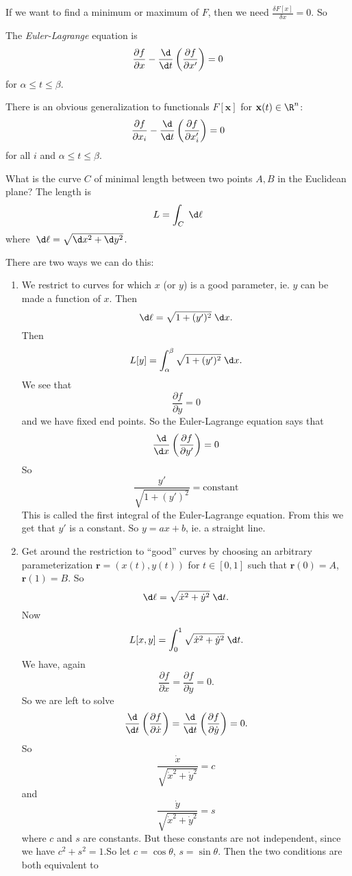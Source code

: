 \documentclass[a4paper]{article}
\begin{document}
If we want to find a minimum or maximum of $F$, then we need $\frac{\delta F[x]}{\delta x} = 0$. So
\begin{defi}
  The \emph{Euler-Lagrange} equation is
  \[
    \frac{\partial f}{\partial x} - \frac{\d}{\d t}\left(\frac{\partial f}{\partial  x'}\right) = 0
  \]
  for $\alpha \leq t \leq \beta$.
\end{defi}
There is an obvious generalization to functionals $F[\mathbf{x}]$  for $\mathbf{x}(t) \in \R^n$:
\[
  \frac{\partial f}{\partial x_i} - \frac{\d }{\d t}\left(\frac{\partial f}{\partial x_i'}\right) = 0
\]
for all $i$ and $\alpha \leq t \leq \beta$.
\begin{eg}
  What is the curve $C$ of minimal length between two points $A, B$ in the Euclidean plane? The length is
  \[
    L = \int_C \;\d \ell
  \]
  where $\;\d \ell = \sqrt{\d x^2 + \d y^2}$.

  There are two ways we can do this:
  \begin{enumerate}
    \item We restrict to curves for which $x$ (or $y$) is a good parameter, ie. $y$ can be made a function of $x$. Then
      \[
        \d \ell = \sqrt{1 + (y')^2}\;\d x.
      \]
      Then
      \[
        L[y] = \int_\alpha^\beta \sqrt{1 + (y')^2}\;\d x.
      \]
      We see that
      \[
        \frac{\partial f}{\partial y} = 0
      \]
      and we have fixed end points. So the Euler-Lagrange equation says that
      \[
        \frac{\d}{\d x} \left(\frac{\partial f}{\partial y'}\right) = 0
      \]
      So
      \[
        \frac{y'}{\sqrt{1 + (y')^2}} = \text{constant}
      \]
      This is called the first integral of the Euler-Lagrange equation. From this we get that $y'$ is a constant. So $y = ax + b$, ie. a straight line.
    \item Get around the restriction to ``good'' curves by choosing an arbitrary parameterization $\mathbf{r} = (x(t), y(t))$ for $t\in [0, 1]$ such that $\mathbf{r}(0) = A$, $\mathbf{r}(1) = B$. So
      \[
        \d \ell = \sqrt{\dot x^2 + \dot y^2}\;\d t.
      \]
      Now
      \[
        L[x, y] = \int_0^1 \sqrt{\dot x^2 + \dot y^2} \;\d t.
      \]
      We have, again
      \[
        \frac{\partial f}{\partial x} = \frac{\partial f}{\partial y} = 0.
      \]
      So we are left to solve
      \[
        \frac{\d }{\d t}\left(\frac{\partial f}{\partial \dot x}\right) = \frac{\d }{\d t}\left(\frac{\partial f}{\partial \dot y}\right)  = 0.
      \]
      So
      \[
        \frac{\dot x}{\sqrt{\dot x^2 + \dot y^2}} = c
      \]
      and
      \[
        \frac{\dot y}{\sqrt{\dot x^2 + \dot y^2}} = s
      \]
      where $c$ and $s$ are constants. But these constants are not independent, since we have $c^2 + s^2 = 1$.So let $c = \cos \theta$, $s = \sin \theta$. Then the two conditions are both equivalent to


\end{enumerate}
\end{eg}
\end{document}
